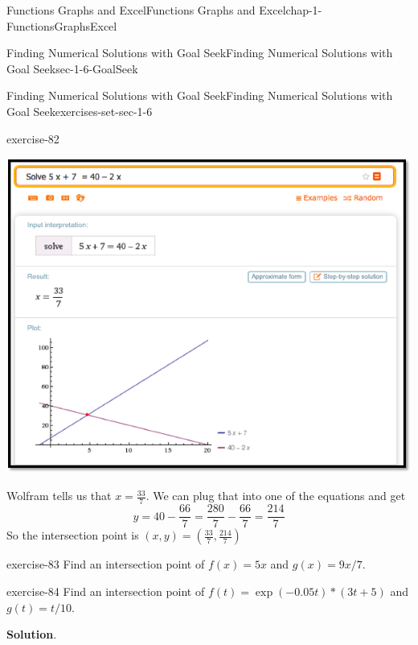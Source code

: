 \documentclass[oneside,10pt,]{book}
\numberwithin{equation}{section}
\begin{document}
\begin{chapterptx}{Functions Graphs and Excel}{}{Functions Graphs and Excel}{}{}{chap-1-FunctionsGraphsExcel}
\begin{sectionptx}{Finding Numerical Solutions with Goal Seek}{}{Finding Numerical Solutions with Goal Seek}{}{}{sec-1-6-GoalSeek}
\begin{exercises-subsection-numberless}{Finding Numerical Solutions with Goal Seek}{}{Finding Numerical Solutions with Goal Seek}{}{}{exercises-set-sec-1-6}
\begin{divisionexercise}{7}{}{}{exercise-82}
\begin{sidebyside}{1}{0}{0}{0}
\begin{sbspanel}{1}%
\includegraphics[width=1\linewidth]{images/sec1-6-sol7a.png}
\end{sbspanel}%
\end{sidebyside}%
 Wolfram tells us that \(x=\frac{33}{7}\). We can plug that into one of the equations and get%
%
\begin{equation*}
y=40-\frac{66}{7}=\frac{280}{7}-\frac{66}{7}=\frac{214}{7}
\end{equation*}
\hypertarget{p-516}{}%
So the intersection point is \((x,y)=(\frac{33}{7}  ,\frac{214}{7})\)%
\end{divisionexercise}%
\begin{divisionexercise}{8}{}{}{exercise-83}%
\hypertarget{p-517}{}%
Find an intersection point of \(f(x) = 5 x\)  and \(g(x) = 9 x / 7\).%
\end{divisionexercise}%
\begin{divisionexercise}{9}{}{}{exercise-84}%
\hypertarget{p-518}{}%
Find an intersection point of \(f(t) = \exp(-0.05 t)*(3 t + 5)\) and \(g(t) = t/10\).%
\par\smallskip%
\noindent\textbf{Solution}.\hypertarget{solution-40}{}\quad%
\hypertarget{p-519}{}%
\leavevmode%
\begin{sidebyside}{1}{0}{0}{0}%
\begin{sbspanel}{1}%

\end{sbspanel}
\end{sidebyside}
\end{divisionexercise}
\end{exercises-subsection-numberless}
\end{sectionptx}
\end{chapterptx}
\end{document}
